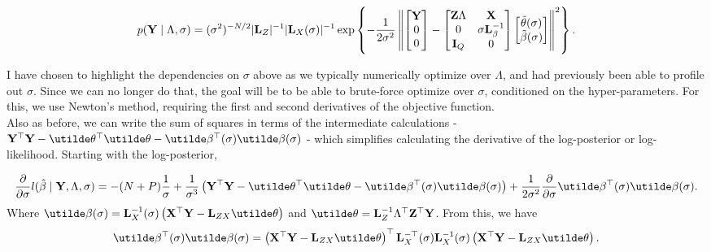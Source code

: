 \documentclass[10pt]{article}
\begin{document}
\begin{equation*}
p({\bf Y} \mid \Lambda, \sigma) =
(\sigma^2)^{-N/2}|{\bf L}_Z|^{-1}
|{\bf L}_X(\sigma)|^{-1}
\exp\left\{-\frac{1}{2\sigma^2}
\left\|
\begin{bmatrix}{\bf Y} \\ 0 \\ 0 \end{bmatrix} -
\begin{bmatrix}{\bf Z}\Lambda & {\bf X} \\
0 & \sigma{\bf L}^{-1}_\beta \\
{\bf I}_Q & 0
\end{bmatrix}
\begin{bmatrix} \tilde\theta(\sigma) \\ \tilde\beta(\sigma) \end{bmatrix}
\right\|^2
\right\}.
\end{equation*}

I have chosen to highlight the dependencies on $\sigma$ above as we
typically numerically optimize over $\Lambda$, and had previously been
able to profile out $\sigma$. Since we can no longer do that, the
goal will be to be able to brute-force optimize over $\sigma$,
conditioned on the hyper-parameters. For this, we use Newton's method,
requiring the first and second derivatives of the objective function. \\

Also as before, we can write the sum of squares in terms of
the intermediate calculations - ${\bf Y}^\top{\bf Y} -
\utilde\theta^\top\utilde\theta -
\utilde\beta^\top(\sigma)\utilde\beta(\sigma)$ - which simplifies calculating the
derivative of the log-posterior or log-likelihood. Starting with the log-posterior,

\begin{equation*}
\frac{\partial}{\partial\sigma}l(\hat\beta \mid {\bf Y}, \Lambda,
\sigma) = 
-(N+P)\frac{1}{\sigma} + \frac{1}{\sigma^3}\left({\bf Y}^\top{\bf
    Y}-\utilde\theta^\top\utilde\theta
  -\utilde\beta^\top(\sigma)\utilde\beta(\sigma)\right) + 
\frac{1}{2\sigma^2}\frac{\partial}{\partial\sigma}\utilde\beta^\top(\sigma)\utilde\beta(\sigma).
\end{equation*}
Where $\utilde\beta(\sigma) = {\bf L}_X^{-1}(\sigma)\left({\bf
    X}^\top{\bf Y} - {\bf L}_{ZX}\utilde\theta\right)$ and
$\utilde\theta = {\bf L}_Z^{-1}\Lambda^\top{\bf Z}^\top{\bf Y}$. From this, we have
\begin{equation*}
\utilde\beta^\top(\sigma)\utilde\beta(\sigma) = 
\left({\bf X}^\top{\bf Y} - {\bf L}_{ZX}\utilde\theta\right)^\top
{\bf L}_X^{-\top}(\sigma){\bf L}_X^{-1}(\sigma)\left({\bf X}^\top{\bf Y} - {\bf
    L}_{ZX}\utilde\theta\right).
\end{equation*}
\end{document}
